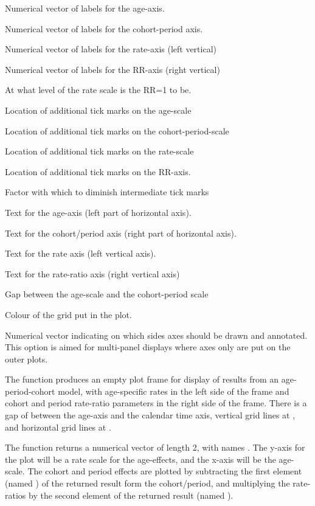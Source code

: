 \begin{Arguments}
\begin{ldescription}
\item[\code{a.lab}] Numerical vector of labels for the age-axis.
\item[\code{cp.lab}] Numerical vector of labels for the cohort-period axis.
\item[\code{r.lab}] Numerical vector of labels for the rate-axis (left vertical)
\item[\code{rr.lab}] Numerical vector of labels for the RR-axis (right vertical)
\item[\code{rr.ref}] At what level of the rate scale is the RR=1 to be.
\item[\code{a.tic}] Location of additional tick marks on the age-scale
\item[\code{cp.tic}] Location of additional tick marks on the cohort-period-scale
\item[\code{r.tic}] Location of additional tick marks on the rate-scale
\item[\code{rr.tic}] Location of additional tick marks on the RR-axis.
\item[\code{tic.fac}] Factor with which to diminish intermediate tick marks
\item[\code{a.txt}] Text for the age-axis (left part of horizontal axis).
\item[\code{cp.txt}] Text for the cohort/period axis (right part of
horizontal axis).
\item[\code{r.txt}] Text for the rate axis (left vertical axis).
\item[\code{rr.txt}] Text for the rate-ratio axis (right vertical axis)
\item[\code{gap}] Gap between the age-scale and the cohort-period scale
\item[\code{col.grid}] Colour of the grid put in the plot.
\item[\code{sides}] Numerical vector indicating on which sides axes should
be drawn and annotated. This option is aimed for multi-panel
displays where axes only are put on the outer plots.
\end{ldescription}
\end{Arguments}
\begin{Details}\relax
The function produces an empty plot frame for display of results
from an age-period-cohort model, with age-specific rates in the left
side of the frame and cohort and period rate-ratio parameters in the
right side of the frame. There is a gap of  between the
age-axis and the calendar time axis, vertical grid lines at
, and horizontal grid lines at
.

The function returns a numerical vector of
length 2, with names . The y-axis for
the plot will be a rate scale for the age-effects, and the x-axis will
be the age-scale. The cohort and period effects are plotted by
subtracting the first element (named ) of the returned result
form the cohort/period, and multiplying  the rate-ratios by the second
element of the returned result (named ).
\end{Details}
